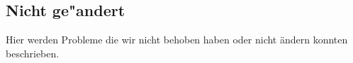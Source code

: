 %



\newpage



\subsection{Nicht ge{"a}ndert}
\label{Abschnitt:Aenderungen:Protokoll:Nicht_behobene_Probleme}

Hier werden Probleme die wir nicht behoben haben oder nicht ändern konnten beschrieben.










